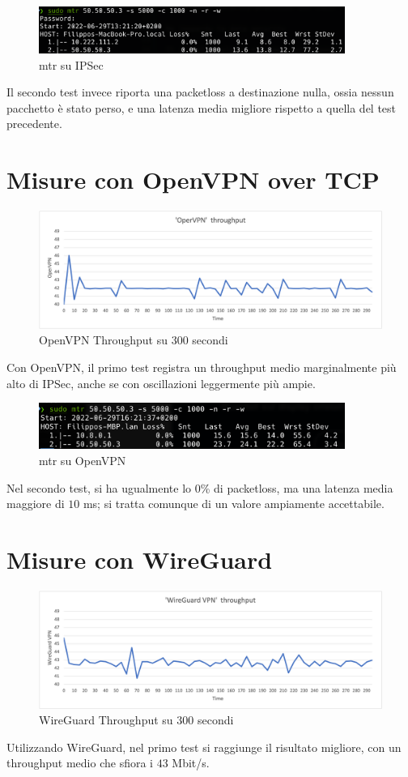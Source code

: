 \begin{figure}[ht]
    \centering
    \includegraphics[width=10cm]{figure/mtr_16min_ipsec.png}
    \caption{mtr su IPSec}
\end{figure}
Il secondo test invece riporta una packetloss a destinazione nulla, ossia nessun pacchetto è stato perso, e una latenza media migliore rispetto a quella del test precedente.


\section{Misure con OpenVPN over TCP}
\begin{figure}[ht]
    \centering
    \includegraphics[width=12cm]{figure/vpn_thr.png-3.png}
    \caption{OpenVPN Throughput su 300 secondi}
\end{figure}
Con OpenVPN, il primo test registra un throughput medio marginalmente più alto di IPSec, anche se con oscillazioni leggermente più ampie.

\begin{figure}[ht]
    \centering
    \includegraphics[width=10cm]{figure/mtr_16min_ovpn.png}
    \caption{mtr su OpenVPN}
\end{figure}
Nel secondo test, si ha ugualmente lo $0$\% di packetloss, ma una latenza media maggiore di $10$ ms; si tratta comunque di un valore ampiamente accettabile.


\section{Misure con WireGuard}
\begin{figure}[ht]
    \centering
    \includegraphics[width=12cm]{figure/vpn_thr.png-4.png}
    \caption{WireGuard Throughput su 300 secondi}
\end{figure}
Utilizzando WireGuard, nel primo test si raggiunge il risultato migliore, con un throughput medio che sfiora i $43$ Mbit/s.

